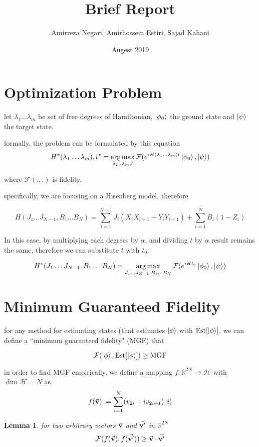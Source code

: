 \documentclass{article}
\title{Brief Report}
\author{Amirreza Negari, Amirhossein Estiri, Sajad Kahani}
\date{Augest 2019}
\DeclareMathOperator*{\argmax}{arg\,max}
\DeclareMathOperator*{\est}{Est}
\begin{document}
\maketitle

\section{Optimization Problem}
let ${\lambda_1\dots\lambda_m}$ be set of free degrees of Hamiltonian, $\ket{\phi_0}$ the ground state and $\ket{\psi}$ the target state.

formally, the problem can be formulated by this equation
\[ H^*(\lambda_1\dots\lambda_m), t^* = \argmax_{\lambda_1..\lambda_m, t} \mathcal{F}(e^{iH(\lambda_1\dots\lambda_m)t} \ket{\phi_0}, \ket{\psi}) \]

where $\mathcal{F}(., .)$ is fidelity.

specifically, we are focusing on a Hisenberg model, therefore

\[ H(J_1\dots J_{N-1}, B_1\dots B_N) = \sum_{i=1}^{N-1} J_i (X_i X_{i+1} + Y_i Y_{i+1}) + \sum_{i=1}^N B_i (1 - Z_i) \]

In this case, by multiplying each degrees by $\alpha$, and dividing $t$ by $\alpha$ result remains the same, therefore we can substitute $t$ with $t_0$.

\begin{equation} 
\label{eq:opt}
H^*(J_1\dots J_{N-1}, B_1\dots B_N) = \argmax_{J_1\dots J_{N-1}, B_1\dots B_N} \mathcal{F}(e^{iHt_0} \ket{\phi_0}, \ket{\psi})
\end{equation}


\section{Minimum Guaranteed Fidelity}

for any method for estimating states (that estimates $\ket{\phi}$ with $\est[\ket{\phi}]$, we can define a ``minimum guaranteed fidelity" (MGF) that

\[ \mathcal{F}(\ket{\phi}, \est[\ket{\phi}]) \ge \text{MGF} \]

in order to find MGF empirically, 
we define a mapping $f: \mathbb{R}^{2N} \rightarrow \mathcal{H}$ with $\dim \mathcal{H} = N$ as 
\[ f(\va{v}) := \sum_{i=1}^N (v_{2i} + iv_{2i+1}) \ket{i}\]

\newtheorem{lemma}{Lemma}
\begin{lemma}
for two arbitrary vectors $\va{v}$ and $\va{v'}$ in $\mathbb{R}^{2N}$
\[ \mathcal{F}(f(\va{v}), f(\va{v'})) \ge \va{v}\cdot\va{v'} \]
\end{lemma}
\end{document}
